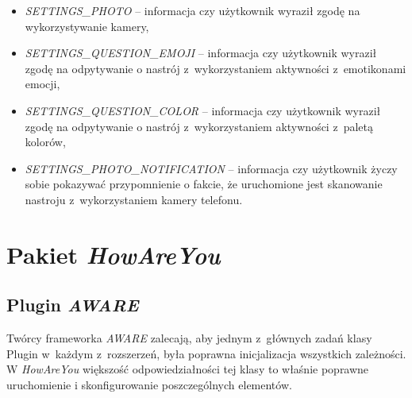 \begin{itemize}
\begin{itemize}
		\item \textit{SETTINGS\_PHOTO} -- informacja czy użytkownik wyraził zgodę na wykorzystywanie kamery,
		
		\item \textit{SETTINGS\_QUESTION\_EMOJI} -- informacja czy użytkownik wyraził zgodę na odpytywanie o nastrój z~wykorzystaniem aktywności z~emotikonami emocji,
		
		\item \textit{SETTINGS\_QUESTION\_COLOR} -- informacja czy użytkownik wyraził zgodę na odpytywanie o nastrój z~wykorzystaniem aktywności z~paletą kolorów,
		
		\item \textit{SETTINGS\_PHOTO\_NOTIFICATION} -- informacja czy użytkownik życzy sobie pokazywać przypomnienie o fakcie, że uruchomione jest skanowanie nastroju z~wykorzystaniem kamery telefonu.
	\end{itemize}
\end{itemize}


\section{Pakiet \textit{HowAreYou}}
\label{sec:pakietHowAreYou}


\subsection{Plugin \textit{AWARE}}

Twórcy frameworka \textit{AWARE} zalecają, aby jednym z~głównych zadań klasy Plugin w~każdym z~rozszerzeń, była poprawna inicjalizacja wszystkich zależności\cite{AwareFramework}. W \textit{HowAreYou} większość odpowiedziałności tej klasy to właśnie poprawne uruchomienie i skonfigurowanie poszczególnych elementów.

